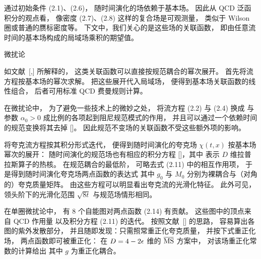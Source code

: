 通过初始条件 (2.1)、(2.6)，
随时间演化的场依赖于基本场。
因此从 QCD 泛函积分的观点看，
像密度 (2.7)、(2.8) 这样的复合场是可观测量，
类似于 Wilson 圈或普通的赝标密度等。
下文中，我们关心的是这些场的关联函数，
即由任意流时间的基本场构成的局域场乘积的期望值。


 微扰论

如文献~[\cite{WilsonFlow},\cite{RenFlow}] 所解释的，
这类关联函数可以直接按规范耦合的幂次展开。
首先将流方程按基本场的幂次求解。
把这些展开代入局域场，
便得到基本场关联函数的线性组合，
后者可用标准 QCD 费曼规则计算。

在微扰论中，
为了避免一些技术上的微妙之处，
将流方程 (2.2) 与 (2.4) 换成
与参数 $\alpha_0>0$ 成比例的各项起到阻尼规范模式的作用，
并且可以通过一个依赖时间的规范变换将其去掉
[\cite{WilsonFlow}]。
因此规范不变场的关联函数不受这些额外项的影响。

将夸克流方程按其积分形式迭代，
便得到随时间演化的夸克场 $\chi(t,x)$
按基本场幂次的展开：
随时间演化的规范场也有相应的积分方程
[\cite{WilsonFlow}]，其中
表示 $D$ 维拉普拉斯算子的热核。
在规范耦合的最低阶，
可略去式 (2.11) 中的相互作用项，
于是得到随时间演化夸克场两点函数的表达式
其中 $g_0$ 与 $M_0$ 分别为裸耦合与（对角的）夸克质量矩阵。
由这些方程可以明显看出夸克流的光滑化特征。
此外可见，
领头阶下的光滑化范围 $\sqrt{8t}$ 与规范场情形相同。

在单圈微扰论中，
有 $8$ 个自能图对两点函数 (2.14) 有贡献。
这些图中的顶点来自 QCD 作用量
以及积分方程 (2.11) 的迭代。
按照文献~[\cite{RenFlow}] 的思路，
容易算出各图的紫外发散部分，
并且随即发现：只需照常重正化夸克质量，
并按下式重正化场，
两点函数即可被重正化：
在 $D=4-2\epsilon$ 维的 $\MSbar$ 方案中，
对该场重正化常数的计算给出
其中 $g$ 为重正化耦合。


